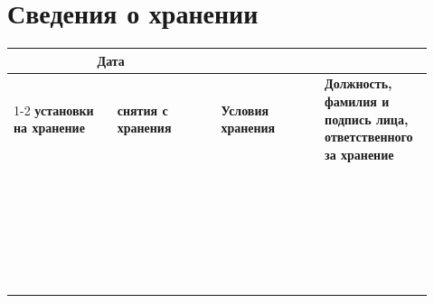 \documentclass[14pt,a4paper,final]{extreport}
\newlength{\rs}
\begin{document}
\newpage

\chapter{Сведения о хранении}

\begin{center}
	\small	\begin{longtable}{|p{0.23\linewidth}|p{0.23\linewidth}|p{0.23\linewidth}|p{0.23\linewidth}|}
		
		\hline
		\multicolumn{2}{|c|}{\textbf{Дата}}  &  & \\
		\cline{1-2}
		\textbf{установки на хранение} & \textbf{снятия с хранения} &  \textbf{Условия хранения} &\textbf{Должность, фамилия и подпись лица, ответственного за хранение} \\
		
		\endfirsthead
		
		
		\endfoot
		\hline
		\endlastfoot
		
		& & & \\ \hline
		& & & \\ \hline
		& & & \\ \hline
		& & & \\ \hline
		& & & \\ \hline
		& & & \\ \hline
		& & & \\ \hline
		& & & \\ \hline
		& & & \\ \hline
		& & & \\ \hline
		& & & \\ \hline
		& & & \\ \hline
		& & & \\ \hline
		& & & \\ \hline
		& & & \\ \hline
		& & & \\ \hline
		& & & \\ \hline
		& & & \\ \hline
		& & & \\ \hline
		& & & \\ \hline
		& & & \\ \hline
		& & & \\ \hline
		& & & \\ \hline
		& & & \\ \hline
		& & & \\ \hline
		& & & \\ \hline
		& & & \\ 
		
		
		
		
		
	\end{longtable}
\end{center}
\end{document}
